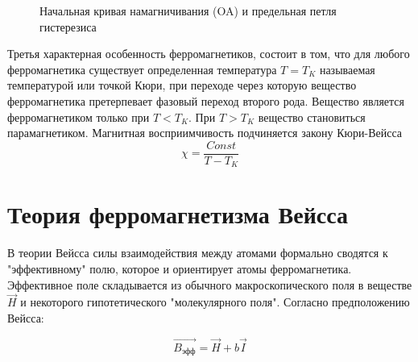 \documentclass[a4paper,14pt]{article} %
\begin{document}
\begin{figure}[H]
	\caption{Начальная кривая намагничивания (OA) и предельная петля гистерезиса}
\end{figure}

Третья характерная особенность ферромагнетиков, состоит в том, что для любого ферромагнетика существует определенная температура $T = T_K$ называемая температурой или точкой Кюри, при переходе через которую вещество ферромагнетика претерпевает фазовый переход второго рода. Вещество является ферромагнетиком только при $T < T_K$. При $T > T_K$ вещество становиться парамагнетиком. Магнитная восприимчивость подчиняется закону Кюри-Вейсса 
\[\chi = \frac{Const}{T - T_K}\]

\section{Теория ферромагнетизма Вейсса}

В теории Вейсса силы взаимодействия между атомами формально сводятся к "эффективному" полю, которое и ориентирует атомы ферромагнетика. Эффективное поле складывается из обычного макроскопического поля в веществе $\overrightarrow{H}$ и некоторого гипотетического "молекулярного поля". Согласно предположению Вейсса:

\[\overrightarrow{B_\text{эфф}} = \overrightarrow{H} + b\overrightarrow{I}\]
\end{document}
